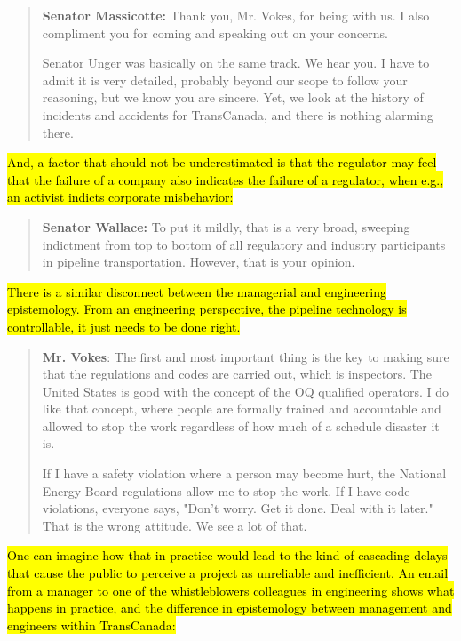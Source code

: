 \documentclass{article}
\begin{document}
	\begin{quote}
		\textbf{Senator Massicotte:} Thank you, Mr. Vokes, for being with us. I also compliment you for coming and speaking out on your concerns.

		Senator Unger was basically on the same track. We hear you. I have to admit it is very detailed, probably beyond our scope to follow your reasoning, but we know you are sincere. Yet, we look at the history of incidents and accidents for TransCanada, and there is nothing alarming there.

		\citep{SenateofCanada2013} 
	\end{quote}

	\hl{And, a factor that should not be underestimated is that the regulator may feel that the failure of a company also indicates the failure of a regulator, when e.g., an activist indicts corporate misbehavior:}

	\begin{quote}
		\textbf{Senator Wallace:} To put it mildly, that is a very broad, sweeping indictment from top to bottom of all regulatory and industry participants in pipeline transportation. However, that is your opinion.

		\citep{SenateofCanada2013} 
	\end{quote}

	\hl{There is a similar disconnect between the managerial and engineering epistemology. From an engineering perspective, the pipeline technology is controllable, it just needs to be done right. }

	\begin{quote}
		\textbf{Mr. Vokes}: The first and most important thing is the key to making sure that the regulations and codes are carried out, which is inspectors. The United States is good with the concept of the OQ qualified operators. I do like that concept, where people are formally trained and accountable and allowed to stop the work regardless of how much of a schedule disaster it is. 

		If I have a safety violation where a person may become hurt, the National Energy Board regulations allow me to stop the work. If I have code violations, everyone says, "Don't worry. Get it done. Deal with it later." That is the wrong attitude. We see a lot of that.

		\cite{SenateofCanada2013}
	\end{quote}

	\hl{One can imagine how that in practice would lead to the kind of cascading delays that cause the public to perceive a project as unreliable and inefficient. An email from a manager to one of the whistleblowers colleagues in engineering shows what happens in practice, and the difference in epistemology between management and engineers within TransCanada:}
\end{document}
